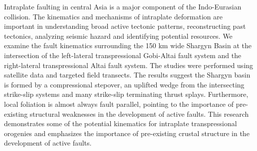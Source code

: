 \begin{abstractpage}
Intraplate faulting in central Asia is a major component of the Indo-Eurasian collision. The kinematics and mechanisms of intraplate deformation are important in understanding broad active tectonic patterns, reconstructing past tectonics, analyzing seismic hazard and identifying potential resources. We examine the fault kinematics surrounding the 150 km wide Shargyn Basin at the intersection of the left-lateral transpressional Gobi-Altai fault system and the right-lateral transpressional Altai fault system. The studies were performed using satellite data and targeted field transects. The results suggest the Shargyn basin is formed by a compressional stepover, an uplifted wedge from the intersecting strike-slip systems and many strike-slip terminating thrust splays. Furthermore, local foliation is almost always fault parallel, pointing to the importance of pre-existing structural weaknesses in the development of active faults. This research demonstrates some of the potential kinematics for intraplate transpressional orogenies and emphasizes the importance of pre-existing crustal structure in the development of active faults.
\end{abstractpage}
